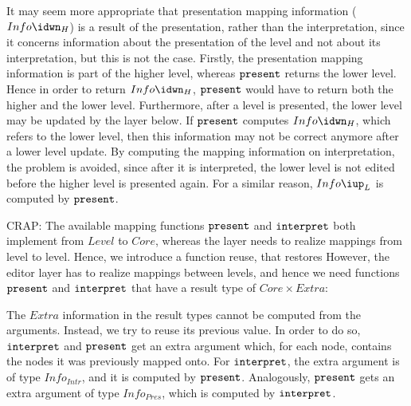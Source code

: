 It may seem more appropriate that presentation mapping information ($Info\idwn_{H}$) is a result of the presentation, rather than the interpretation, since it concerns information about the presentation of the level and not about its interpretation, but this is not the case. Firstly, the presentation mapping information is part of the higher level, whereas ${\tt present}$ returns the lower level. Hence in order to return $Info\idwn_{H}$, ${\tt present}$ would have to return both the higher and the lower level.  Furthermore, after a level is presented, the lower level may be updated by the layer below. If ${\tt present}$ computes $Info\idwn_{H}$, which refers to the lower level, then this information may not be correct anymore after a lower level update. By computing the mapping information on interpretation, the problem is avoided, since after it is interpreted, the lower level is not edited before the higher level is presented again. For a similar reason, $Info\iup_{L}$ is computed by ${\tt present}$.



\bc CRAP:
The available mapping functions ${\tt present}$ and ${\tt interpret}$ both implement from $Level$ to $Core$, whereas the layer needs to realize mappings from level to level. Hence, we introduce a function reuse, that restores However, the editor layer has to realize mappings between levels, and hence we need functions ${\tt present}$ and ${\tt interpret}$ that have a result type of $Core \times Extra$:

The $Extra$ information in the result types cannot be computed from the arguments. Instead, we try to reuse its previous value. In order to do so, ${\tt interpret}$ and ${\tt present}$ get an extra argument which, for each node, contains the nodes it was previously mapped onto. For ${\tt interpret}$, the extra argument is of type $Info_{Intr}$, and it is computed by ${\tt present}$. Analogously, ${\tt present}$ gets an extra argument of type $Info_{Pres}$, which is computed by ${\tt interpret}$. 
\ec

%																
